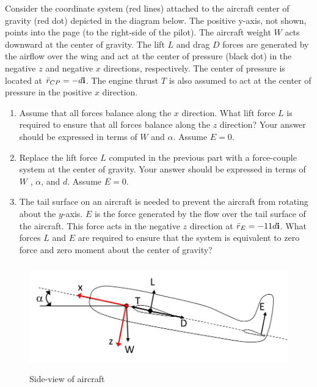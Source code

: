 

Consider the coordinate system (red lines) attached to the aircraft center of gravity (red dot) depicted in the
diagram below. The positive y-axis, not shown, points into the page (to the right-side of the pilot). The aircraft
weight $W$ acts downward at the center of gravity. The lift $L$ and drag $D$ forces are generated by the airflow
over the wing and act at the center of pressure (black dot) in the negative $z$ and negative $x$ directions,
respectively. The center of pressure is located at $\bar{r}_{CP} = -d {\bf i}$. The engine thrust $T$ is also assumed to act at
the center of pressure in the positive $x$ direction. 

\begin{enumerate}
  \item Assume that all forces balance along the $x$ direction. What lift force $L$ is required to ensure that all forces
  balance along the $z$ direction? Your answer should be expressed in terms of $W$ and $\alpha$. Assume $E = 0$. 
  \item Replace the lift force $L$ computed in the previous part with a force-couple system at the center of gravity.
Your answer should be expressed in terms of $W$ , $\alpha$, and $d$.  Assume $E = 0$.
  \item The tail surface on an aircraft is needed to prevent the aircraft from rotating about the $y$-axis. $E$ is the
  force generated by the flow over the tail surface of the aircraft. This force acts in the negative $z$ direction at $\bar{r}_{E} = -11d{\bf i}$.  What forces $L$ and $E$ are required to ensure that the system is equivalent to zero force and zero moment about the center of gravity?
\end{enumerate}

\begin{figure}[ht!]
  \centering
  \includegraphics[height=1.8in]{fig.png}
  \caption*{Side-view of aircraft}
\end{figure}

